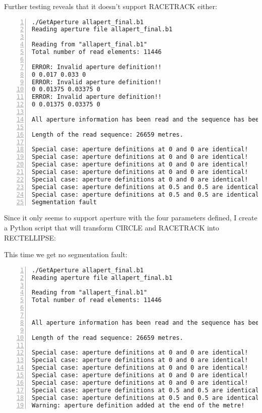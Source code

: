 \documentclass[11pt]{article}
\begin{document}
Further testing reveals that it doesn't support RACETRACK either:
\begin{lstlisting}[frame=single, basicstyle=\ttfamily\footnotesize, numbers=left] 
./GetAperture allapert_final.b1 
Reading aperture file allapert_final.b1

Reading from "allapert_final.b1"
Total number of read elements: 11446

ERROR: Invalid aperture definition!!
0 0.017 0.033 0 
ERROR: Invalid aperture definition!!
0 0.01375 0.03375 0 
ERROR: Invalid aperture definition!!
0 0.01375 0.03375 0 

All aperture information has been read and the sequence has been created!

Length of the read sequence: 26659 metres.

Special case: aperture definitions at 0 and 0 are identical!
Special case: aperture definitions at 0 and 0 are identical!
Special case: aperture definitions at 0 and 0 are identical!
Special case: aperture definitions at 0 and 0 are identical!
Special case: aperture definitions at 0 and 0 are identical!
Special case: aperture definitions at 0.5 and 0.5 are identical!
Special case: aperture definitions at 0.5 and 0.5 are identical!
Segmentation fault
\end{lstlisting}
\vspace{20pt}

Since it only seems to support aperture with the four parameters defined, I create a Python script that will transform CIRCLE and RACETRACK into RECTELLIPSE:



\vspace{20pt}

This time we get no segmentation fault:
\begin{lstlisting}[frame=single, basicstyle=\ttfamily\footnotesize, numbers=left] 
./GetAperture allapert_final.b1 
Reading aperture file allapert_final.b1

Reading from "allapert_final.b1"
Total number of read elements: 11446


All aperture information has been read and the sequence has been created!

Length of the read sequence: 26659 metres.

Special case: aperture definitions at 0 and 0 are identical!
Special case: aperture definitions at 0 and 0 are identical!
Special case: aperture definitions at 0 and 0 are identical!
Special case: aperture definitions at 0 and 0 are identical!
Special case: aperture definitions at 0 and 0 are identical!
Special case: aperture definitions at 0.5 and 0.5 are identical!
Special case: aperture definitions at 0.5 and 0.5 are identical!
Warning: aperture definition added at the end of the metre!
\end{lstlisting}
\vspace{20pt}
\end{document}
